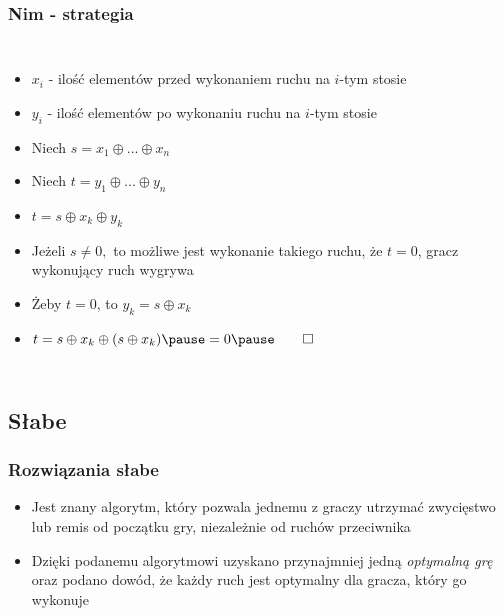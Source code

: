 \documentclass[polish,envcountsect,10pt]{beamer}
\begin{document}
                \begin{frame}
                    \frametitle{Nim - strategia}
                    \begin{columns}
                            \begin{itemize}
                                \item<1-> $x_i$ - ilość elementów przed wykonaniem ruchu na $i$-tym stosie
                                \item<1-> $y_i$ - ilość elementów po wykonaniu ruchu na $i$-tym stosie
                                \item<1-> Niech $s = x_1 \oplus ... \oplus x_n$
                                \item<1-> Niech $t = y_1 \oplus ... \oplus y_n$
                                \item<1-> $t = s \oplus x_k \oplus y_k$
                                \item<2-> Jeżeli $s \neq 0,$ to możliwe jest wykonanie takiego ruchu, że $t = 0$, gracz wykonujący ruch wygrywa
                                \item<3-> Żeby $t = 0$, to $y_k = s \oplus x_k$
                                \item<4-> $t = s \oplus x_k \oplus (s \oplus x_k) \pause = 0 \pause \qed$
                            \end{itemize}
                \end{columns}
                \end{frame}
            \subsection{Słabe}
            \begin{frame}
                \frametitle{Rozwiązania słabe}
                \begin{itemize}
                    \item<1-> Jest znany algorytm, który pozwala jednemu z graczy utrzymać zwycięstwo lub remis od początku gry, niezależnie od ruchów przeciwnika
                    \item<2-> Dzięki podanemu algorytmowi uzyskano przynajmniej jedną \textit{optymalną grę} oraz podano dowód, że każdy ruch jest optymalny dla gracza, który go wykonuje                    
                \end{itemize}     
            \end{frame}
\end{document}
